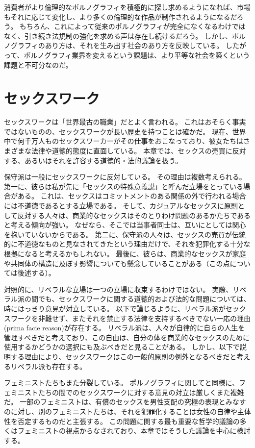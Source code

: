 \documentclass[paper=a4,book,openany]{jlreq}
\begin{document}
消費者がより倫理的なポルノグラフィを積極的に探し求めるようになれば、市場もそれに応じて変化し、より多くの倫理的な作品が制作されるようになるだろう。
もちろん、これによって従来のポルノグラフィが完全になくなるわけではなく、引き続き法規制の強化を求める声は存在し続けるだろう。
しかし、ポルノグラフィのあり方は、それを生み出す社会のあり方を反映している。
したがって、ポルノグラフィ業界を変えるという課題は、より平等な社会を築くという課題と不可分なのだ。

\section{セックスワーク}

セックスワークは「世界最古の職業」だとよく言われる。
これはおそらく事実ではないものの、セックスワークが長い歴史を持つことは確かだ。
現在、世界中で何千万人ものセックスワーカーがその仕事をおこなっており、彼女たちはさまざまな法律や道徳的態度に直面している。
本章では、セックスの売買に反対する、あるいはそれを許容する道徳的・法的議論を扱う。

保守派は一般にセックスワークに反対している。
その理由は複数考えられる。
第一に、彼らは私が先に「セックスの特殊意義説」と呼んだ立場をとっている場合がある。
これは、セックスはコミットメントのある関係の外で行われる場合には不道徳であるとする立場である。
そして、カジュアルなセックスに原則として反対する人々は、商業的なセックスはそのとりわけ問題のあるかたちであると考える傾向が強い。
なぜなら、そこでは当事者同士は、互いにとしては関心を抱いていないからである。
第二に、保守派の人々は、セックスの売買が伝統的に不道徳なものと見なされてきたという理由だけで、それを犯罪化する十分な根拠になると考えるかもしれない。
最後に、彼らは、商業的なセックスが家庭や共同体の構造に及ぼす影響についても懸念していることがある（この点については後述する）。

対照的に、リベラルな立場は一つの立場に収束するわけではない。
実際、リベラル派の間でも、セックスワークに関する道徳的および法的な問題については、時にはっきり意見が対立している。
以下で論じるように、リベラル派がセックスワークを非難せず、またそれを禁止する法律を支持するべきでない一応の理由(prima facie reason)が存在する。
リベラル派は、人々が自律的に自らの人生を管理すべきだと考えており、この自由は、自分の体を商業的なセックスのために使用するかどうかの選択にも及ぶべきだと見ることがある。
しかし、以下で説明する理由により、セックスワークはこの一般的原則の例外となるべきだと考えるリベラル派も存在する。

フェミニストたちもまた分裂している。
ポルノグラフィに関してと同様に、フェミニストたちの間でのセックスワークに対する意見の対立は厳しくまた複雑だ。
一部のフェミニストは、有償のセックスを男性支配の究極の表現とみなすのに対し、別のフェミニストたちは、それを犯罪化することは女性の自律や主体性を否定するものだと主張する。
この問題に関する最も重要な哲学的議論の多くはフェミニストの視点からなされており、本章ではそうした議論を中心に検討する。
\end{document}
